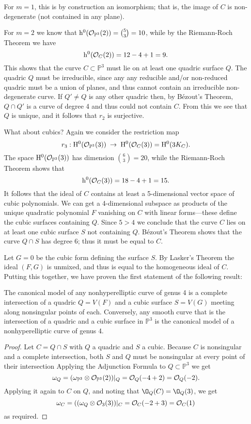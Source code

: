 \documentclass[12pt, leqno]{article}
\def\PP{{\mathbb P}}
\def\cO{{\cal O}}
\def\h{{\rm h}}
\begin{document}
For $m=1$, this is by construction an isomorphism; that is, the image of $C$ is non-degenerate (not contained in any plane).

For $m=2$ we know that $\h^0(\cO_{\PP^3}(2)) = \binom{5}{3} = 10$, while by the Riemann-Roch
Theorem we have
$$
\h^0(\cO_C(2)) = 12 - 4 + 1 = 9.
$$
This shows that the curve $C \subset \PP^3$ must lie on at least one quadric surface $Q$. The quadric $Q$ must be irreducible, since any any reducible and/or non-reduced quadric must be a union of planes, and thus cannot contain an irreducible non-degenerate curve.
If $Q'\neq Q$ is any other quadric then, by B\'ezout's Theorem, $Q\cap Q'$ is a curve of degree 4 and thus could not contain $C$. From this we see that $Q$ is unique, and it follows that $r_2$ is surjective.

What about cubics? Again we consider the restriction map
$$
r_3 : \HH^0(\cO_{\PP^3}(3)) \; \to \; \HH^0(\cO_{C}(3)) = \HH^0(3K_C).
$$
The space $\HH^0(\cO_{\PP^3}(3))$ has dimension $\binom{6}{3} = 20$, while  the Riemann-Roch Theorem shows that
$$
\h^0(\cO_C(3)) = 18 - 4 + 1 = 15.
$$
It follows that the ideal of $C$ contains at least a 5-dimensional vector space of cubic polynomials. We can get a 4-dimensional subspace as products of the unique quadratic polynomial $F$ vanishing on $C$ with linear forms---these define the cubic surfaces containing $Q$. Since $5 > 4$ we  conclude that the curve $C$ lies on at least one cubic surface $S$  not containing $Q$. 
B\'ezout's Theorem shows that the curve $Q \cap S$ has degree 6; thus it must be equal to $C$. 

Let $G=0$ be the cubic form defining the surface $S$. By Lasker's Theorem the ideal $(F,G)$ is unmixed, and thus is equal to the homogeneous ideal of $C$. Putting this together, we have proven the first statement of the following result:

\begin{theorem}
The canonical model of any nonhyperelliptic curve of genus 4 is a complete intersection of a quadric $Q = V(F)$ and a cubic surface $S = V(G)$ meeting along nonsingular points of each. Conversely, any smooth curve that is the intersection of a quadric and a cubic surface in $\PP^3$ is the canonical model of a nonhyperelliptic curve of genus 4.
\end{theorem}
 
\begin{proof}
Let $C = Q\cap S$ with $Q$ a quadric and $S$ a cubic. Because $C$ is nonsingular and a complete intersection, both $S$ and $Q$ must be nonsingular at every point of their intersection Applying the Adjunction Formula to $Q\subset \PP^3$ we get
$$
\omega_Q = (\omega_{\PP^3} \otimes \cO_{\PP^3}(2))|_Q = \cO_Q(-4+2) = \cO_Q(-2).
$$
Applying it again to $C$ on $Q$, and noting that $\O_Q(C) = \O_Q(3)$, we get
$$
\omega_C = ((\omega_{Q} \otimes \cO_{3}(3))|_C = \cO_C(-2+3) = \cO_C(1)
$$
as required. 
\end{proof}
\end{document}
